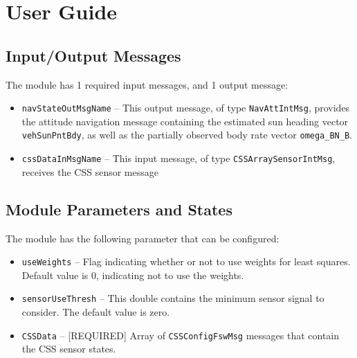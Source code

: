 
\section{User Guide}
\subsection{Input/Output Messages}
The module has 1 required input messages, and 1 output message:
\begin{itemize}
	\item {\tt navStateOutMsgName} -- This output message, of type {\tt NavAttIntMsg}, provides the attitude navigation message containing the estimated sun heading vector {\tt vehSunPntBdy}, as well as the partially observed body rate vector {\tt omega\_BN\_B}.
	\item {\tt cssDataInMsgName} -- This input message, of type {\tt CSSArraySensorIntMsg}, receives the CSS sensor message
\end{itemize}

\subsection{Module Parameters and States}
The module has the following parameter that can be configured:
\begin{itemize}
	\item {\tt useWeights} -- Flag indicating whether or not to use weights for least squares.  Default value is 0, indicating not to use the weights.
	
	\item {\tt sensorUseThresh} -- This double contains the minimum sensor signal to consider.     The default value is zero. 
	
	\item {\tt CSSData} -- [REQUIRED] Array of {\tt CSSConfigFswMsg} messages that contain the CSS sensor states.	
\end{itemize}

